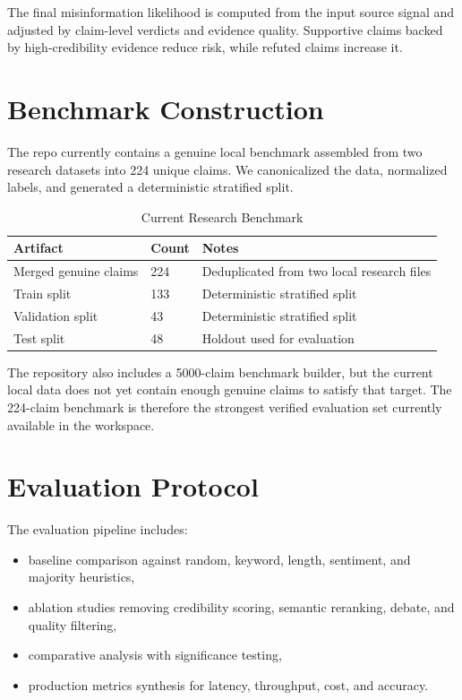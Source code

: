 \documentclass[conference]{IEEEtran}
\begin{document}
The final misinformation likelihood is computed from the input source signal and adjusted by claim-level verdicts and evidence quality. Supportive claims backed by high-credibility evidence reduce risk, while refuted claims increase it.

\section{Benchmark Construction}
The repo currently contains a genuine local benchmark assembled from two research datasets into 224 unique claims. We canonicalized the data, normalized labels, and generated a deterministic stratified split.

\begin{table}[t]
\centering
\caption{Current Research Benchmark}
\label{tab:benchmark}
\renewcommand{\arraystretch}{1.1}
\begin{tabular}{p{2.4cm} p{2.0cm} p{2.0cm}}
\toprule
\textbf{Artifact} & \textbf{Count} & \textbf{Notes} \\
\midrule
Merged genuine claims & 224 & Deduplicated from two local research files \\
Train split & 133 & Deterministic stratified split \\
Validation split & 43 & Deterministic stratified split \\
Test split & 48 & Holdout used for evaluation \\
\bottomrule
\end{tabular}
\end{table}

The repository also includes a 5000-claim benchmark builder, but the current local data does not yet contain enough genuine claims to satisfy that target. The 224-claim benchmark is therefore the strongest verified evaluation set currently available in the workspace.

\section{Evaluation Protocol}
The evaluation pipeline includes:
\begin{itemize}
  \item baseline comparison against random, keyword, length, sentiment, and majority heuristics,
  \item ablation studies removing credibility scoring, semantic reranking, debate, and quality filtering,
  \item comparative analysis with significance testing,
  \item production metrics synthesis for latency, throughput, cost, and accuracy.
\end{itemize}
\end{document}
